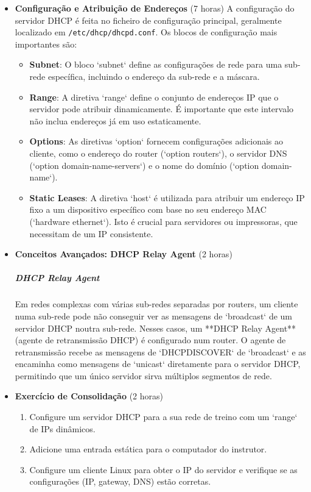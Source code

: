 \documentclass[10pt,a4paper]{article}
\begin{document}
\begin{itemize}
		\item \textbf{Configuração e Atribuição de Endereços} (7 horas)
		A configuração do servidor DHCP é feita no ficheiro de configuração principal, geralmente localizado em \texttt{/etc/dhcp/dhcpd.conf}. Os blocos de configuração mais importantes são:
		\begin{itemize}
			\item \textbf{Subnet}: O bloco `subnet` define as configurações de rede para uma sub-rede específica, incluindo o endereço da sub-rede e a máscara.
			\item \textbf{Range}: A diretiva `range` define o conjunto de endereços IP que o servidor pode atribuir dinamicamente. É importante que este intervalo não inclua endereços já em uso estaticamente.
			\item \textbf{Options}: As diretivas `option` fornecem configurações adicionais ao cliente, como o endereço do router (`option routers`), o servidor DNS (`option domain-name-servers`) e o nome do domínio (`option domain-name`).
			\item \textbf{Static Leases}: A diretiva `host` é utilizada para atribuir um endereço IP fixo a um dispositivo específico com base no seu endereço MAC (`hardware ethernet`). Isto é crucial para servidores ou impressoras, que necessitam de um IP consistente.
		\end{itemize}
		
		\item \textbf{Conceitos Avançados: DHCP Relay Agent} (2 horas)
		\subparagraph{DHCP Relay Agent} Em redes complexas com várias sub-redes separadas por routers, um cliente numa sub-rede pode não conseguir ver as mensagens de `broadcast` de um servidor DHCP noutra sub-rede. Nesses casos, um **DHCP Relay Agent** (agente de retransmissão DHCP) é configurado num router. O agente de retransmissão recebe as mensagens de `DHCPDISCOVER` de `broadcast` e as encaminha como mensagens de `unicast` diretamente para o servidor DHCP, permitindo que um único servidor sirva múltiplos segmentos de rede.
		
		\item \textbf{Exercício de Consolidação} (2 horas)
		\begin{enumerate}
			\item Configure um servidor DHCP para a sua rede de treino com um `range` de IPs dinâmicos.
			\item Adicione uma entrada estática para o computador do instrutor.
			\item Configure um cliente Linux para obter o IP do servidor e verifique se as configurações (IP, gateway, DNS) estão corretas.
		\end{enumerate}
	\end{itemize}
	
\end{document}
